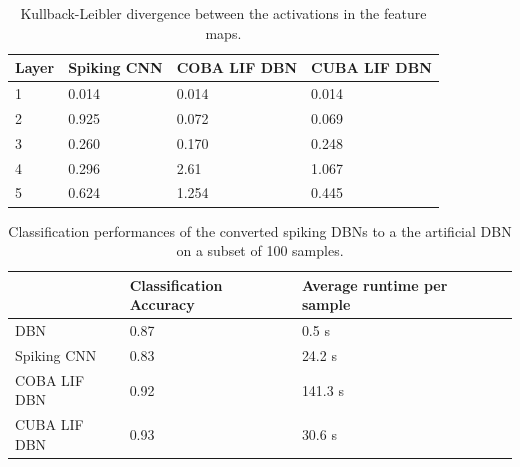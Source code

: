 \begin{table}[]
\centering
\caption{Kullback-Leibler divergence between the activations in the feature maps.}
\label{tab:kldiv}
\begin{tabularx}{\textwidth}{@{}XXXX@{}}
\hline
Layer & Spiking CNN   & COBA LIF DBN & CUBA LIF DBN \\ \hline
1     & 0.014 & 0.014        & 0.014        \\
2     & 0.925 & 0.072        & 0.069        \\
3     & 0.260 & 0.170        & 0.248        \\
4     & 0.296 & 2.61         & 1.067        \\
5     & 0.624 & 1.254        & 0.445        \\ \hline
\end{tabularx}
\end{table}


\begin{table}[]
\centering
\caption{Classification performances of the converted spiking DBNs to a the artificial DBN on a subset of 100 samples.}
\label{tab:convperf}
\begin{tabularx}{\textwidth}{@{}XXXX@{}}
\hline
	 				& Classification Accuracy    & Average runtime per sample \\ \hline
DBN     			& 0.87 & 0.5 s               \\
Spiking CNN     	& 0.83 & 24.2 s                \\
COBA LIF DBN     	& 0.92 & 141.3 s                \\
CUBA LIF DBN     	& 0.93 & 30.6 s                 \\\hline
\end{tabularx}
\end{table}


